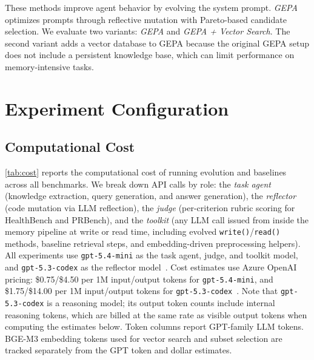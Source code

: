 These methods improve agent behavior by evolving the system prompt.
\textit{GEPA}~\citep{gepa} optimizes prompts through reflective mutation with Pareto-based candidate selection.
We evaluate two variants: \textit{GEPA} and \textit{GEPA + Vector Search}.
The second variant adds a vector database to GEPA because the original GEPA setup does not include a persistent knowledge base, which can limit performance on memory-intensive tasks.

\section{Experiment Configuration}
\label{app:experiment-config}

\subsection{Computational Cost}
\label{app:cost}

\autoref{tab:cost} reports the computational cost of running \sysname{} evolution and baselines across all benchmarks.
We break down API calls by role: the \emph{task agent} (knowledge extraction, query generation, and answer generation), the \emph{reflector} (code mutation via LLM reflection), the \emph{judge} (per-criterion rubric scoring for HealthBench and PRBench), and the \emph{toolkit} (any LLM call issued from inside the memory pipeline at write or read time, including evolved \texttt{write()}/\texttt{read()} methods, baseline retrieval steps, and embedding-driven preprocessing helpers).
All experiments use \texttt{gpt-5.4-mini} as the task agent, judge, and toolkit model, and \texttt{gpt-5.3-codex} as the reflector model~\citep{openai2026gpt54mini,openai2026gpt53codex}.
Cost estimates use Azure OpenAI pricing: \$0.75/\$4.50 per 1M input/output tokens for \texttt{gpt-5.4-mini}, and \$1.75/\$14.00 per 1M input/output tokens for \texttt{gpt-5.3-codex}~\citep{openai2026gpt54mini,openai2026gpt53codex}.
Note that \texttt{gpt-5.3-codex} is a reasoning model; its output token counts include internal reasoning tokens, which are billed at the same rate as visible output tokens when computing the estimates below.
Token columns report GPT-family LLM tokens.
BGE-M3 embedding tokens used for vector search and subset selection are tracked separately from the GPT token and dollar estimates.

